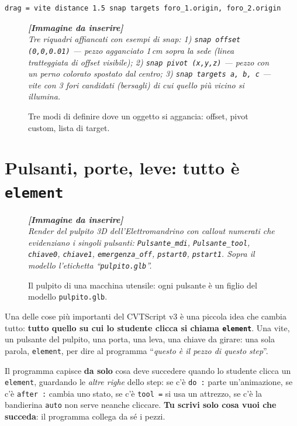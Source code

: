 ﻿\documentclass[a4paper,12pt,oneside]{book}
\newcommand{\kw}[1]{\texttt{\color{keycolor}#1}}
\newcommand{\val}[1]{\texttt{\color{cvtgreen}#1}}
\newcommand{\file}[1]{\texttt{#1}}
\newcommand{\imgph}[2]{%
  \begin{tcolorbox}[colback=cvtlightblue!30,colframe=cvtblue!40,%
    width=#1,halign=center,valign=center,height=5cm,boxrule=0.5pt,arc=3pt]%
    \textcolor{cvtgray}{\itshape\footnotesize\textbf{[Immagine da inserire]}\\[3pt]#2}%
  \end{tcolorbox}}
\begin{document}
\begin{lstlisting}
drag = vite distance 1.5 snap targets foro_1.origin, foro_2.origin
\end{lstlisting}

\begin{figure}[H]
  \centering
  \imgph{13cm}{Tre riquadri affiancati con esempi di snap: 1) \texttt{snap offset (0,0,0.01)} --- pezzo agganciato 1\,cm sopra la sede (linea tratteggiata di offset visibile); 2) \texttt{snap pivot (x,y,z)} --- pezzo con un perno colorato spostato dal centro; 3) \texttt{snap targets a, b, c} --- vite con 3 fori candidati (bersagli) di cui quello più vicino si illumina.}
  \caption{Tre modi di definire dove un oggetto si aggancia: offset, pivot custom, lista di target.}
  \label{fig:snap-varianti}
\end{figure}

\chapter{Pulsanti, porte, leve: tutto è \texttt{element}}
\label{ch:pulsanti}

\begin{figure}[H]
  \centering
  \imgph{12cm}{Render del pulpito 3D dell'Elettromandrino con callout numerati che evidenziano i singoli pulsanti: \texttt{Pulsante\_mdi}, \texttt{Pulsante\_tool}, \texttt{chiave0}, \texttt{chiave1}, \texttt{emergenza\_off}, \texttt{pstart0}, \texttt{pstart1}. Sopra il modello l'etichetta ``\file{pulpito.glb}''.}
  \caption{Il pulpito di una macchina utensile: ogni pulsante è un figlio del modello \file{pulpito.glb}.}
  \label{fig:pulpito-annotato}
\end{figure}

Una delle cose più importanti del CVTScript v3 è una piccola idea che cambia
tutto: \textbf{tutto quello su cui lo studente clicca si chiama \kw{element}}.
Una vite, un pulsante del pulpito, una porta, una leva, una chiave da girare:
una sola parola, \kw{element}, per dire al programma ``\emph{questo è il pezzo
di questo step}''.

\begin{regola}
Il programma capisce \textbf{da solo} cosa deve succedere quando lo studente
clicca un \kw{element}, guardando le \emph{altre righe} dello step:
se c'è \kw{do :} parte un'animazione, se c'è \kw{after :} cambia uno stato,
se c'è \kw{tool =} si usa un attrezzo, se c'è la bandierina \val{auto} non
serve neanche cliccare. \textbf{Tu scrivi solo cosa vuoi che succeda}: il
programma collega da sé i pezzi.
\end{regola}
\end{document}
